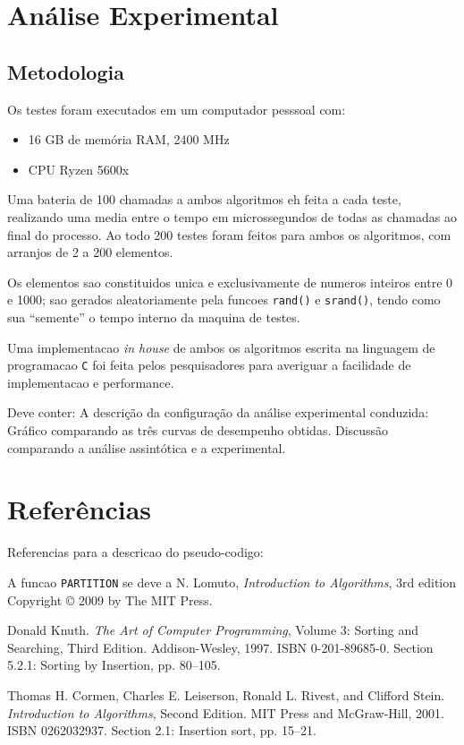 \documentclass{article}
\begin{document}
\section{Análise Experimental}

\subsection{Metodologia}

Os testes foram executados em um computador pesssoal com:
\begin{itemize}
  \item{16 GB de memória RAM, 2400 MHz}
  \item{CPU Ryzen 5600x}
\end{itemize}
Uma bateria de 100 chamadas a ambos algoritmos eh feita a cada teste, realizando uma media entre o tempo em microssegundos de todas as chamadas ao final do processo. Ao todo 200 testes foram feitos para ambos os algoritmos, com arranjos de 2 a 200 elementos.

Os elementos sao constituidos unica e exclusivamente de numeros inteiros entre 0 e 1000; sao gerados aleatoriamente pela funcoes \texttt{rand()} e \texttt{srand()}, tendo como sua ``semente'' o tempo interno da maquina de testes.

Uma implementacao \textit{in house} de ambos os algoritmos escrita na linguagem de programacao \texttt{C} foi feita pelos pesquisadores para averiguar a facilidade de implementacao e performance.


Deve conter:
A descrição da configuração da análise experimental conduzida:
Gráfico comparando as três curvas de desempenho obtidas.
Discussão comparando a análise assintótica e a experimental.

\section{Referências}
Referencias para a descricao do pseudo-codigo:

A funcao \texttt{PARTITION} se deve a N. Lomuto, \textit{Introduction to Algorithms}, 3rd edition Copyright © 2009 by The MIT Press.

Donald Knuth. \textit{The Art of Computer Programming}, Volume 3: Sorting and Searching, Third Edition. Addison-Wesley, 1997. ISBN 0-201-89685-0. Section 5.2.1: Sorting by Insertion, pp. 80–105.

Thomas H. Cormen, Charles E. Leiserson, Ronald L. Rivest, and Clifford Stein. \textit{Introduction to Algorithms}, Second Edition. MIT Press and McGraw-Hill, 2001. ISBN 0262032937. Section 2.1: Insertion sort, pp. 15–21.
\end{document}
